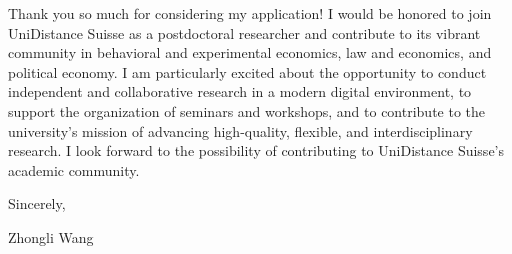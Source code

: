 \documentclass{nfr}
\begin{document}
Thank you so much for considering my application! 
I would be honored to join UniDistance Suisse as a postdoctoral researcher and contribute to its vibrant community in behavioral and experimental economics, law and economics, and political economy. 
I am particularly excited about the opportunity to conduct independent and collaborative research in a modern digital environment, to support the organization of seminars and workshops, and to contribute to the university’s mission of advancing high-quality, flexible, and interdisciplinary research. 
I look forward to the possibility of contributing to UniDistance Suisse’s academic community.
\vspace{3mm}

\noindent Sincerely,\\
\vspace{10mm}

\noindent Zhongli Wang

\vspace{5mm}



\end{document}
